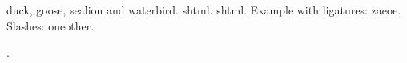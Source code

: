 \documentclass{article}
\begin{document}
\Gls{duck}, \gls{goose}, \gls{sealion} and \gls{waterbird}.
\Gls{shtml}. \Gls{shtml}. Example with ligatures: \gls{zaeoe}.
Slashes: \gls{oneother}.

.

\printunsrtglossaries
\end{document}
